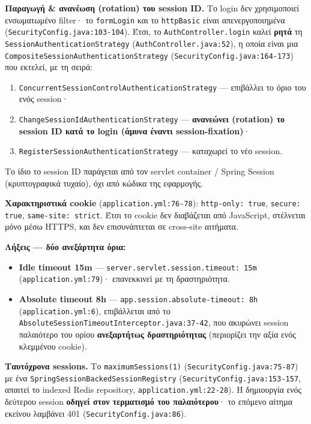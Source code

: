 \documentclass[11pt,a4paper]{article}
\newcommand{\code}[1]{\texttt{#1}}
\begin{document}
\textbf{Παραγωγή \& ανανέωση (rotation) του session ID.} Το login δεν χρησιμοποιεί ενσωματωμένο filter· το \code{formLogin} και το \code{httpBasic} είναι απενεργοποιημένα (\code{SecurityConfig.java:103-104}).
Έτσι, το \code{AuthController.login} καλεί \textbf{ρητά} τη \code{SessionAuthenticationStrategy}
(\code{AuthController.java:52}), η οποία είναι μια \code{CompositeSessionAuthenticationStrategy}
(\code{SecurityConfig.java:164-173}) που εκτελεί, με τη σειρά:
\begin{enumerate}[leftmargin=2em]\setlength\itemsep{1pt}
    \item \code{ConcurrentSessionControlAuthenticationStrategy} --- επιβάλλει το όριο του ενός session·
    \item \code{ChangeSessionIdAuthenticationStrategy} --- \textbf{ανανεώνει (rotation) το session ID
          κατά το login (άμυνα έναντι session-fixation)}·
    \item \code{RegisterSessionAuthenticationStrategy} --- καταχωρεί το νέο session.
\end{enumerate}
Το ίδιο το session ID παράγεται από τον servlet container / Spring Session (κρυπτογραφικά τυχαίο),
όχι από κώδικα της εφαρμογής.

\textbf{Χαρακτηριστικά cookie} (\code{application.yml:76-78}): \code{http-only: true},
\code{secure: true}, \code{same-site: strict}. Έτσι το cookie δεν διαβάζεται από JavaScript,
στέλνεται μόνο μέσω HTTPS, και δεν επισυνάπτεται σε cross-site αιτήματα.

\textbf{Λήξεις --- δύο ανεξάρτητα όρια:}
\begin{itemize}[leftmargin=2em]\setlength\itemsep{1pt}
    \item \textbf{Idle timeout 15m} --- \code{server.servlet.session.timeout: 15m}
          (\code{application.yml:79})· επανεκκινεί με τη δραστηριότητα.
    \item \textbf{Absolute timeout 8h} --- \code{app.session.absolute-timeout: 8h}
          (\code{application.yml:6}), επιβάλλεται από το \code{AbsoluteSessionTimeoutInterceptor.java:37-42},
          που ακυρώνει session παλαιότερο του ορίου \textbf{ανεξαρτήτως δραστηριότητας} (περιορίζει την
          αξία ενός κλεμμένου cookie).
\end{itemize}

\textbf{Ταυτόχρονα sessions.} Το \code{maximumSessions(1)} (\code{SecurityConfig.java:75-87}) με ένα
\code{SpringSession\allowbreak{}Backed\allowbreak{}SessionRegistry} (\code{SecurityConfig.java:153-157}, απαιτεί το indexed
Redis repository, \code{application.yml:22-28}). Η δημιουργία ενός δεύτερου session \textbf{οδηγεί στον τερματισμό του παλαιότερου}· το επόμενο
αίτημα εκείνου λαμβάνει 401 (\code{SecurityConfig.java:86}).
\end{document}
